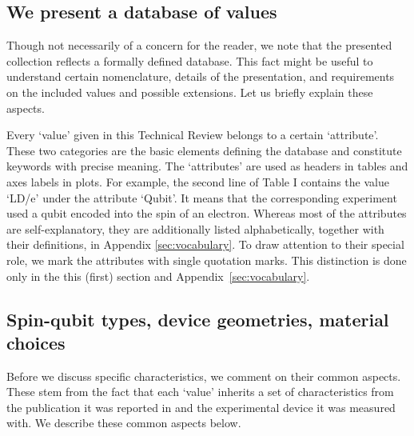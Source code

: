 \documentclass[aps, prx, showpacs, twocolumn, superscriptaddress, notitlepage, longbibliography, floatfix, nofootinbib]{revtex4-2}
\newcommand{\myKey}[1]{$\whitearrowupfrombar$\textit{#1}}
\renewcommand{\myKey}[1]{\textit{#1}}
\renewcommand{\myKey}[1]{`{#1}'}
\newcommand{\recheck}[1]{{#1}}
\begin{document}
\subsection{We present a database of values}

Though not necessarily of a concern for the reader, we note that the presented collection reflects a formally defined database. This fact might be useful to understand certain nomenclature, details of the presentation, and requirements on the included values and possible extensions. Let us briefly explain these aspects.

Every \myKey{value} given in this Technical Review belongs to a certain \myKey{attribute}. These two categories are the basic elements defining the database and constitute keywords with precise meaning. The \myKey{attributes} are used as headers in tables and axes labels in plots. \recheck{For example, the second line of Table I contains the value \myKey{LD/e} under the attribute \myKey{Qubit}.} It means that the corresponding experiment used a qubit encoded into the spin of an electron. Whereas most of the attributes are self-explanatory, they are additionally listed alphabetically, together with their definitions, in Appendix \ref{sec:vocabulary}. To draw attention to their special role, we mark the attributes with single quotation marks.
This distinction is done only in the this (first) section and Appendix~\ref{sec:vocabulary}.

\subsection{Spin-qubit types, device geometries, material choices}

Before we discuss specific characteristics, we comment on their common aspects. These stem from the fact that each \myKey{value} inherits a set of characteristics from the publication it was reported in and the experimental device it was measured with. We describe these common aspects below.
\end{document}
